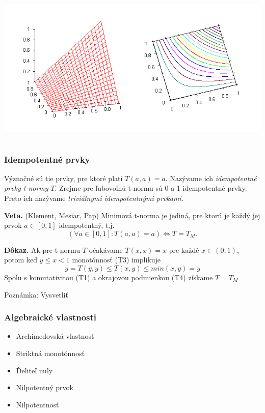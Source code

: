 \documentclass{beamer}
\begin{document}
\begin{frame}
\begin{columns}
\begin{minipage}[c][0.4\textheight][c]{\linewidth}
\end{minipage}
\begin{minipage}[c][0.4\textheight][c]{\linewidth}
  \centering
  \includegraphics[width=0.9\linewidth]{ProductTnorm}
\end{minipage}
\end{columns}
\end{frame}

\begin{frame}
\frametitle{Idempotentné prvky}
\begin{definition}
Význačné sú tie prvky, pre ktoré platí $T(a,a)=a.$ Nazývame ich
{\em idempotentné prvky t-normy} $T.$ Zrejme pre ľubovoľnú t-normu sú 0 a 1
idempotentné prvky. Preto ich nazývame {\em triviálnymi idempotentnými
prvkami.}
\end{definition}
\end{frame}


\begin{frame}
\begin{center}
{\bf Veta.} (Klement, Mesiar, Pap)
Minimová t-norma je jediná, pre ktorú je každý jej prvok $a \in [0,1]$
idempotentný, t.j.
$$( \forall a \in [0,1]: T(a,a)=a) \iff T=T_M.$$
\end{center}
\begin{center}
{\bf Dôkaz.} Ak pre t-normu $T$ očakávame $T(x,x)=x$ pre každé $x\in (0,1)$, potom keď $y\leq x<1$ monotónnosť (T3) implikuje 
$$y=T(y,y)\leq T(x,y)\leq min(x,y)=y$$
Spolu s komutativitou (T1) a okrajovou podmienkou (T4) získame $T=T_M$
\end{center}
Poznámka: Vysvetliť
\end{frame}

\begin{frame}
\frametitle{Algebraické vlastnosti}
\begin{itemize}
\item Archimedovská vlastnosť
\item Striktná monotónnosť
\item Ďeliteľ nuly
\item Nilpotentný prvok
\item Nilpotentnosť
\end{itemize}
\end{frame}
\end{document}
